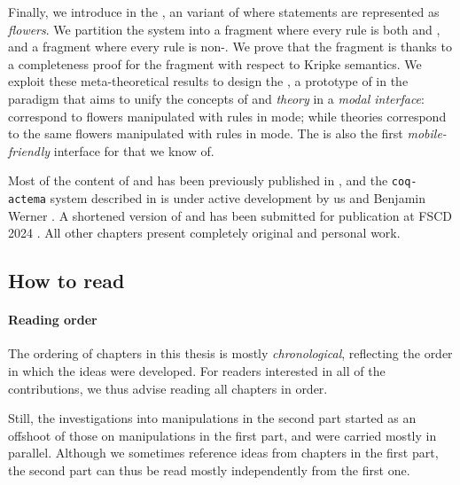 \begin{description}
  \AP
  Finally, we introduce in  the , an
   variant of  where statements are represented
   as \emph{flowers}. We partition the system into a
  \emph{} fragment where every rule is both  and
  , and a \emph{} fragment where every rule is
  non-. We prove that the  fragment is
   thanks to a completeness proof for the  fragment
  with respect to Kripke semantics. We exploit these meta-theoretical results to
  design the , a prototype of  in the 
  paradigm that aims to unify the concepts of \emph{} and \emph{theory}
  in a \emph{modal interface}:  correspond to flowers manipulated with
   rules in \Proof mode; while theories correspond to the same
  flowers manipulated with  rules in \Edit mode. The
   is also the first \emph{mobile-friendly} interface for
   that we know of.
\end{description}

\begin{kaonote}
Most of the content of  and  has been previously published
in \cite{10.1145/3497775.3503692}, and the \texttt{coq-actema} system described
in  is under active development by us and Benjamin Werner
\cite{coq-actema}. A shortened version of  and  has
been submitted for publication at FSCD 2024 \cite{flower-calculus}. All other
chapters present completely original and personal work.
\end{kaonote}

\subsection{How to read}

\paragraph{Reading order}

The ordering of chapters in this thesis is mostly \emph{chronological},
reflecting the order in which the ideas were developed. For readers interested
in all of the contributions, we thus advise reading all chapters in order.

Still, the investigations into  manipulations in the second part started
as an offshoot of those on  manipulations in the first part, and were
carried mostly in parallel. Although we sometimes reference ideas from chapters
in the first part, the second part can thus be read mostly independently from
the first one.

